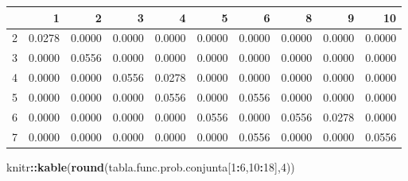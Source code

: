\documentclass[]{book}
\newenvironment{Shaded}{\begin{snugshade}}{\end{snugshade}}
\newcommand{\DataTypeTok}[1]{\textcolor[rgb]{0.13,0.29,0.53}{#1}}
\newcommand{\DecValTok}[1]{\textcolor[rgb]{0.00,0.00,0.81}{#1}}
\newcommand{\KeywordTok}[1]{\textcolor[rgb]{0.13,0.29,0.53}{\textbf{#1}}}
\newcommand{\NormalTok}[1]{#1}
\newcommand{\OperatorTok}[1]{\textcolor[rgb]{0.81,0.36,0.00}{\textbf{#1}}}
\begin{document}
\begin{Shaded}
\end{Shaded}

\begin{tabular}{l|r|r|r|r|r|r|r|r|r}
\hline
  & 1 & 2 & 3 & 4 & 5 & 6 & 8 & 9 & 10\\
\hline
2 & 0.0278 & 0.0000 & 0.0000 & 0.0000 & 0.0000 & 0.0000 & 0.0000 & 0.0000 & 0.0000\\
\hline
3 & 0.0000 & 0.0556 & 0.0000 & 0.0000 & 0.0000 & 0.0000 & 0.0000 & 0.0000 & 0.0000\\
\hline
4 & 0.0000 & 0.0000 & 0.0556 & 0.0278 & 0.0000 & 0.0000 & 0.0000 & 0.0000 & 0.0000\\
\hline
5 & 0.0000 & 0.0000 & 0.0000 & 0.0556 & 0.0000 & 0.0556 & 0.0000 & 0.0000 & 0.0000\\
\hline
6 & 0.0000 & 0.0000 & 0.0000 & 0.0000 & 0.0556 & 0.0000 & 0.0556 & 0.0278 & 0.0000\\
\hline
7 & 0.0000 & 0.0000 & 0.0000 & 0.0000 & 0.0000 & 0.0556 & 0.0000 & 0.0000 & 0.0556\\
\hline
\end{tabular}

\begin{Shaded}
\begin{Highlighting}[]
\NormalTok{knitr}\OperatorTok{::}\KeywordTok{kable}\NormalTok{(}\KeywordTok{round}\NormalTok{(tabla.func.prob.conjunta[}\DecValTok{1}\OperatorTok{:}\DecValTok{6}\NormalTok{,}\DecValTok{10}\OperatorTok{:}\DecValTok{18}\NormalTok{],}\DecValTok{4}\NormalTok{))}
\end{Highlighting}
\end{Shaded}
\end{document}
